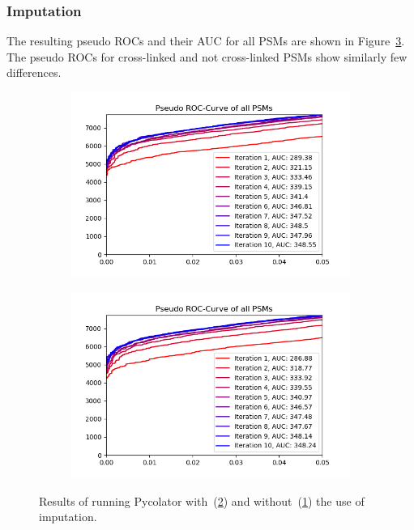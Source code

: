 \subsubsection{Imputation}
\label{lab:results:imputation}
The resulting pseudo ROCs and their AUC for all PSMs are shown in Figure~\ref{fig:results:imputation}. The pseudo ROCs for cross-linked and not cross-linked PSMs show similarly few differences.
\renewcommand{\baselinestretch}{0.9}
\begin{figure}
	\normalsize
	\centering
	\begin{subfigure}{0.49 \textwidth}
		\includegraphics[width = \textwidth]{figures/no_imputation.png}
		\caption{}
		\label{fig:results:imputation_no}
	\end{subfigure}
	\hfill
	\begin{subfigure}{0.49 \textwidth}
		\includegraphics[width = \textwidth]{figures/imputation.png}
		\caption{}
		\label{fig:results:imputation_yes}
	\end{subfigure}
	\caption[Results of imputation]{Results of running Pycolator with~(\ref{fig:results:imputation_yes}) and without~(\ref{fig:results:imputation_no}) the use of imputation.}
	\label{fig:results:imputation}
\end{figure}
\renewcommand{\baselinestretch}{1}

